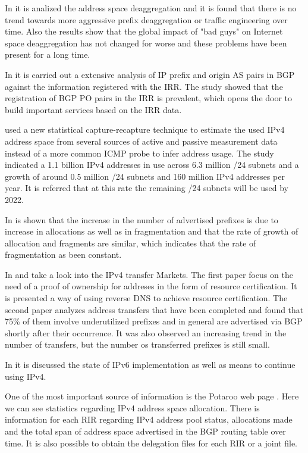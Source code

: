 \documentclass[11pt,a4paper]{scrreprt}
\begin{document}
In \cite{Address_Space_Deaggregation} it is analized the address space deaggregation and it is found that there is no trend towards more aggressive prefix deaggregation or traffic engineering over time. Also the results show that the global impact of "bad guys" on Internet space deaggregation has not changed for worse and these problems have been present for a long time.

In \cite{Comparative_BGP_IRR} it is carried out a extensive analysis of IP prefix and origin AS pairs in BGP against the information registered with the IRR. The study showed that the registration of BGP PO pairs in the IRR is prevalent, which opens the door to build important services based on the IRR data.

\cite{Capturing_Ghosts} used a new statistical capture-recapture technique to estimate the used IPv4 address space from several sources of active and passive measurement data instead of a more common ICMP probe to infer address usage. The study indicated a 1.1 billion IPv4 addresses in use across 6.3 million /24 subnets and a growth of around 0.5 million /24 subnets and 160 million IPv4 addresses per year. It is referred that at this rate the remaining /24 subnets will be used by 2022.

In \cite{Delegation_Structure} is shown that the increase in the number of advertised prefixes is due to increase in allocations as well as in fragmentation and that the rate of growth of allocation and fragments are similar, which indicates that the rate of fragmentation as been constant.


In \cite{Land_Grab} and  \cite{IPv4_Transfer_Markets} take a look into the IPv4 transfer Markets. The first paper focus on the need of a proof of ownership for addreses in the form of resource certification. It is presented a way of using reverse DNS to achieve resource certification. The second paper analyzes address transfers that have been completed and found that 75\% of them involve underutilized prefixes and in general are advertised via BGP shortly after their occurrence. It was also observed an increasing trend in the number of transfers, but the number os transferred prefixes is still small.

In \cite{IPv6_state} it is discussed the state of IPv6 implementation as well as means to continue using IPv4.

One of the most important source of information is the Potaroo web page \cite{Potaroo}. 
Here we can see statistics regarding IPv4 address space allocation. There is information for each RIR regarding IPv4 address pool status, allocations made and the total span of address space advertised in the BGP routing table over time. It is also possible to obtain the delegation files for each RIR or a joint file.
\end{document}
